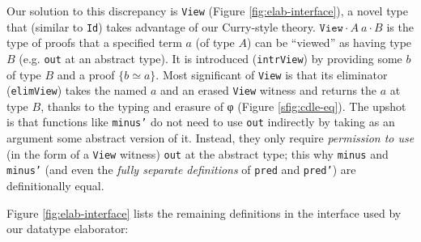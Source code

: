 \documentclass{article}
\begin{document}
Our solution to this discrepancy is \texttt{View} (Figure \ref{fig:elab-interface}),
a novel type that (similar to \texttt{Id}) takes advantage of our Curry-style
theory. \(\texttt{View} ·A\ a ·B\) is the type of proofs that a specified term
$a$ (of type $A$) can be ``viewed'' as having type $B$ (e.g. \texttt{out} at
an abstract type). It is introduced (\texttt{intrView}) by providing some $b$
of type $B$ and a proof \(\{b ≃ a\}\). Most significant of \texttt{View} is that
its eliminator (\texttt{elimView}) takes the named $a$ and an erased
\texttt{View} witness and returns the $a$ at type $B$, thanks to the typing and
erasure of φ (Figure \ref{sfig:cdle-eq}). The upshot is that functions like
\texttt{minus'} do not need to use \texttt{out} indirectly by taking as an argument
some abstract version of it. Instead, they only
require \textit{permission to use} (in the form of a \texttt{View} witness)
\texttt{out} at the abstract type; this why \texttt{minus} and \texttt{minus'}
(and even the \textit{fully separate definitions} of \texttt{pred} and \texttt{pred'}) are
definitionally equal.

Figure \ref{fig:elab-interface} lists the remaining definitions in the interface used by our
datatype elaborator:
\end{document}
